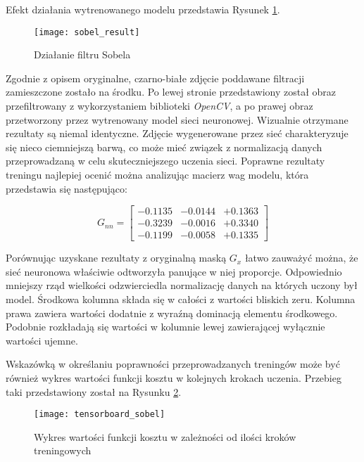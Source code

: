     Efekt działania wytrenowanego modelu przedstawia Rysunek \ref{fig:sobel_result}.

    \begin{figure}[H]
      \centering
      \texttt{[image: sobel\_result]}
      \caption[Działanie filtru Sobela - źródło: Rysunek własny]{Działanie filtru Sobela}
      \label{fig:sobel_result}
    \end{figure}

    Zgodnie z opisem oryginalne, czarno-białe zdjęcie poddawane filtracji zamieszczone
    zostało na środku. Po lewej stronie przedstawiony został obraz przefiltrowany
    z wykorzystaniem biblioteki \textit{OpenCV}, a po prawej obraz przetworzony przez
    wytrenowany model sieci neuronowej. Wizualnie otrzymane rezultaty są niemal
    identyczne. Zdjęcie wygenerowane przez sieć charakteryzuje się nieco ciemniejszą
    barwą, co może mieć związek z normalizacją danych przeprowadzaną w celu skuteczniejszego
    uczenia sieci. Poprawne rezultaty treningu najlepiej ocenić można analizując
    macierz wag modelu, która przedstawia się następująco:

    \[G_{nn} =
    \begin{bmatrix}
    -0.1135 & -0.0144 & +0.1363 \\
    -0.3239 & -0.0016 & +0.3340 \\
    -0.1199 & -0.0058 & +0.1335
    \end{bmatrix}
    \]

    Porównując uzyskane rezultaty z oryginalną maską $G_x$ łatwo zauważyć można,
    że sieć neuronowa właściwie odtworzyła panujące w niej proporcje. Odpowiednio
    mniejszy rząd wielkości odzwierciedla normalizację danych na których uczony
    był model. Środkowa kolumna składa się w całości z wartości bliskich zeru.
    Kolumna prawa zawiera wartości dodatnie z wyraźną dominacją elementu środkowego.
    Podobnie rozkładają się wartości w kolumnie lewej zawierającej wyłącznie wartości
    ujemne.

    Wskazówką w określaniu poprawności przeprowadzanych treningów może być również
    wykres wartości funkcji kosztu w kolejnych krokach uczenia. Przebieg taki
    przedstawiony został na Rysunku \ref{fig:tensorboard_sobel}.

    \begin{figure}[H]
      \centering
      \texttt{[image: tensorboard\_sobel]}
      \caption[Wykres wartości funkcji kosztu w zależności od ilości kroków treningowych - źródło: Rysunek własny]{Wykres wartości funkcji kosztu w zależności od ilości kroków treningowych}
      \label{fig:tensorboard_sobel}
    \end{figure}

